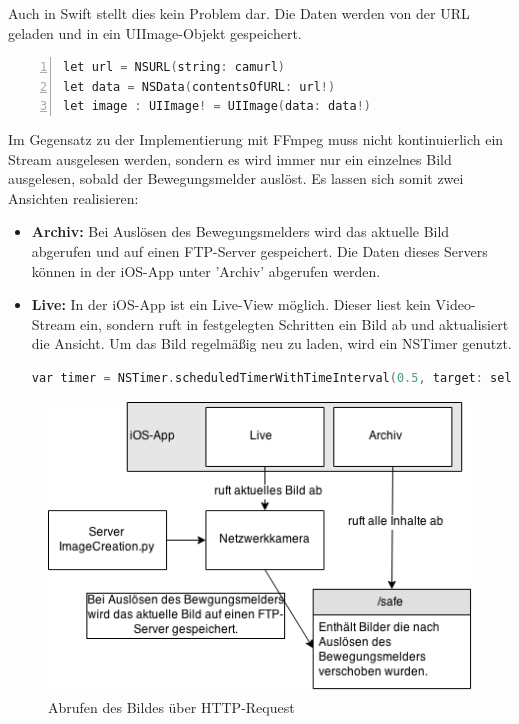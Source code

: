Auch in Swift stellt dies kein Problem dar. Die Daten werden von der URL geladen und in ein UIImage-Objekt gespeichert. 
\begin{lstlisting}[caption = Abrufen eines BIldes von einer URL in Swift, language=c++, frame=single, breaklines=true,columns=fullflexible, commentstyle=\color{gray}\upshape, captionpos=b, numbers = left]
let url = NSURL(string: camurl)
let data = NSData(contentsOfURL: url!)
let image : UIImage! = UIImage(data: data!)
\end{lstlisting}
Im Gegensatz zu der Implementierung mit FFmpeg muss nicht kontinuierlich ein Stream ausgelesen werden, sondern es wird immer nur ein einzelnes Bild ausgelesen, sobald der Bewegungsmelder auslöst. Es lassen sich somit zwei Ansichten realisieren:
\begin{itemize}
	\item \textbf{Archiv:} Bei Auslösen des Bewegungsmelders wird das aktuelle Bild abgerufen und auf einen FTP-Server gespeichert. Die Daten dieses Servers können in der iOS-App unter 'Archiv' abgerufen werden. 
	\item \textbf{Live:} In der iOS-App ist ein Live-View möglich. Dieser liest kein Video-Stream ein, sondern ruft in festgelegten Schritten ein Bild ab und aktualisiert die Ansicht. Um das Bild regelmäßig neu zu laden, wird ein NSTimer genutzt. 
	\begin{lstlisting}[caption = NSTimer in Swift, language=c++, frame=single, breaklines=true,columns=fullflexible, commentstyle=\color{gray}\upshape, captionpos=b]
var timer = NSTimer.scheduledTimerWithTimeInterval(0.5, target: self, selector: Selector("loadImageView"), userInfo: nil, repeats: true)
	\end{lstlisting}
\end{itemize}
\pagebreak
\begin{figure}[h]
	\begin{minipage}{0.9\textwidth}
		\centering
		\includegraphics[width=\textwidth]{./data/httprequest.png}
		\caption{Abrufen des Bildes über HTTP-Request}
	\end{minipage}
\end{figure}

